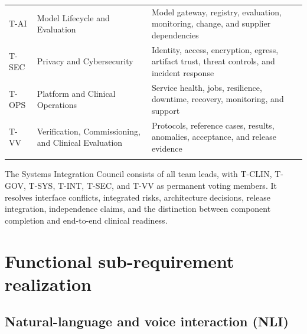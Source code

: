 \documentclass[11pt,letterpaper]{article}
\begin{document}
\begin{small}
\begin{longtable}{@{}L{0.11\textwidth}L{0.29\textwidth}L{0.50\textwidth}@{}}
\addlinespace[2pt]
T-AI & Model Lifecycle and Evaluation & Model gateway, registry, evaluation, monitoring, change, and supplier dependencies \\
\addlinespace[2pt]
T-SEC & Privacy and Cybersecurity & Identity, access, encryption, egress, artifact trust, threat controls, and incident response \\
\addlinespace[2pt]
T-OPS & Platform and Clinical Operations & Service health, jobs, resilience, downtime, recovery, monitoring, and support \\
\addlinespace[2pt]
T-VV & Verification, Commissioning, and Clinical Evaluation & Protocols, reference cases, results, anomalies, acceptance, and release evidence \\
\addlinespace[2pt]
\end{longtable}
\end{small}

The Systems Integration Council consists of all team leads, with T-CLIN, T-GOV, T-SYS, T-INT, T-SEC, and T-VV as permanent voting members. It resolves interface conflicts, integrated risks, architecture decisions, release integration, independence claims, and the distinction between component completion and end-to-end clinical readiness.

\section{Functional sub-requirement realization}

\subsection{Natural-language and voice interaction (NLI)}
\end{document}
